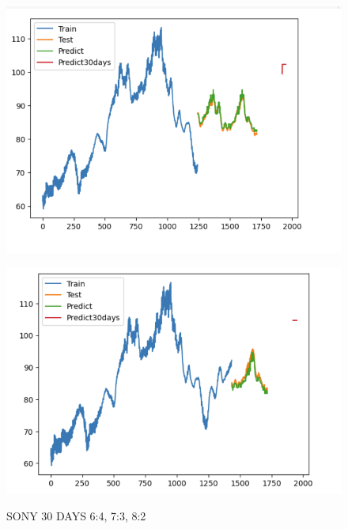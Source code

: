 \documentclass{article}
\begin{document}
\begin{multicols}{2}
\begin{figure}[H]
\begin{minipage}{0.15\textwidth}
    \label{fig:1}
    \end{minipage}%
    \begin{minipage}{0.15\textwidth}
    \centering
    \includegraphics[width=1\textwidth]{Image/Light GBM/SN_7_3_30.png}
  
    \label{fig:2}
    \end{minipage}%
    \begin{minipage}{0.15\textwidth}
    \centering
    \includegraphics[width=1\textwidth]{Image/Light GBM/SN_8_2_30.png}

    \label{fig:3}
    \end{minipage}
    \caption{SONY 30 DAYS  6:4, 7:3, 8:2 }
\end{figure}


\end{multicols}
\end{document}
